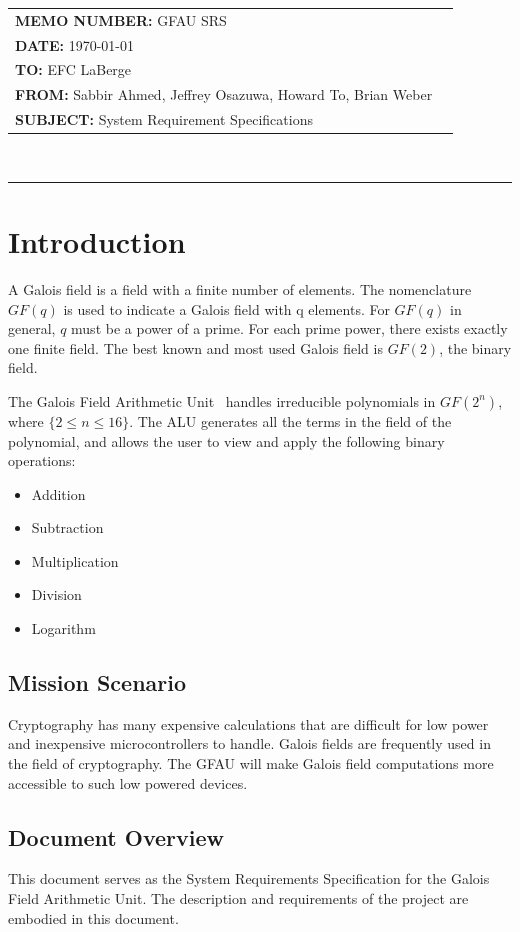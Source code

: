 \documentclass[12pt]{extarticle}
\newcommand{\team}{Galois Field Arithmetic Unit}
\newcommand{\Sabbir}{Sabbir Ahmed}
\newcommand{\Jeffrey}{Jeffrey Osazuwa}
\newcommand{\Howard}{Howard To}
\newcommand{\Brian}{Brian Weber}
\newcommand{\documentinfo}[5]{
    \begin{centering}
        \parbox{2in}{
        \begin{spacing}{1}
            \begin{flushleft}
                \begin{tabular}{l l} #1 \\ #2 \\ #3 \\ #4 \\ #5 \\
                \end{tabular}\\
                \rule{\textwidth}{1pt}
            \end{flushleft}
        \end{spacing} }
    \end{centering} }
\begin{document}
    \documentinfo {\textbf{MEMO NUMBER:} GFAU SRS} {\textbf{DATE:} \today}
    {\textbf{TO: } EFC LaBerge} {\textbf{FROM: }\Sabbir, \Jeffrey, \Howard,
    \Brian} {\textbf{SUBJECT: } System Requirement Specifications}
    \vspace{-0.1in}

    \section{Introduction} A Galois field is a field with a finite number of
    elements. The nomenclature $GF(q)$ is used to indicate a Galois field with
    q elements. For $GF(q)$ in general, $q$ must be a power of a prime. For
    each prime power, there exists exactly one finite field. The best known and
    most used Galois field is $GF(2)$, the binary field.

    The \team~ handles irreducible polynomials in $GF(2^n)$, where $\{2 \leq n
    \leq 16\}$. The ALU generates all the terms in the field of the polynomial,
    and allows the user to view and apply the following binary operations:

    \begin{itemize}

        \item Addition
        \item Subtraction
        \item Multiplication
        \item Division
        \item Logarithm

    \end{itemize}

        \subsection{Mission Scenario} Cryptography has many expensive
        calculations that are difficult for low power and inexpensive
        microcontrollers to handle. Galois fields are frequently used in the
        field of cryptography. The GFAU will make Galois field computations
        more accessible to such low powered devices.

        \subsection{Document Overview} This document serves as the System
        Requirements Specification for the Galois Field Arithmetic Unit. The
        description and requirements of the project are embodied in this
        document.
\end{document}
